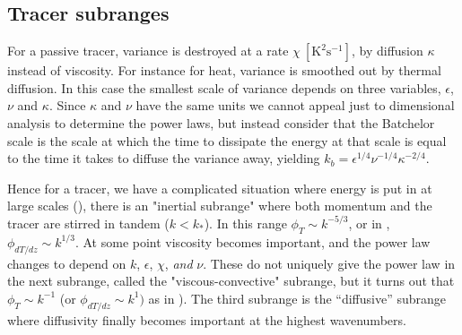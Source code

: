 \documentclass[11pt]{article}
\begin{document}
\subsection{Tracer subranges}

For a passive tracer, variance is destroyed at a rate $\chi\ \mathrm{[K^2 s^{-1}]}$, by diffusion $\kappa$ instead of viscosity.  For instance for heat, variance is smoothed out by thermal diffusion.  In this case the smallest scale of variance depends on three variables, $\epsilon$, $\nu$ and $\kappa$.  Since $\kappa$ and $\nu$ have the same units we cannot appeal just to dimensional analysis to determine the power laws, but instead consider that the Batchelor scale is the scale at which the time to dissipate the energy at that scale is equal to the time it takes to diffuse the variance away, yielding $k_b = \epsilon^{1/4}\nu^{-1/4}\kappa^{-2/4}$.  

Hence for a tracer, we have a complicated situation where energy is put in at large scales (), there is an  "inertial subrange" where both momentum and the tracer are stirred in tandem ($k<k_*$). In this range $\phi_T\sim k^{-5/3}$, or in , $\phi_ {dT/dz} \sim k^{1/3}$.   At some point viscosity becomes important, and the power law changes to depend on $k$, $\epsilon$, $\chi$, \emph{and} $\nu$.  These do not uniquely give the power law in the next subrange, called the "viscous-convective" subrange, but it turns out that $\phi_T\sim k^{-1}$ (or $\phi_ {dT/dz} \sim k^{1})$ as in ).  The third subrange is the ``diffusive'' subrange where diffusivity finally becomes important at the highest wavenumbers.  
\end{document}
